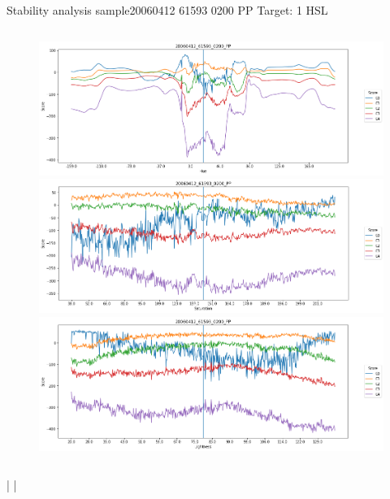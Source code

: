 \documentclass{beamer}
\begin{document}
\begin{frame}{Stability analysis sample}{20060412 61593 0200 PP Target: 1 HSL}
\begin{columns}
\begin{column}{0.45\textwidth}
\begin{figure}[p]
\includegraphics[width=\textwidth]{chapter_stability/20060412_61593_0200_PP/h/scores.png}			\includegraphics[width=\textwidth]{chapter_stability/20060412_61593_0200_PP/s/scores.png}			\includegraphics[width=\textwidth]{chapter_stability/20060412_61593_0200_PP/l/scores.png}
\end{figure}
\end{column}
\end{columns}
\href{run:videos_stability/Messidor_20060412_61593_0200_PP_Target_1_Checking_Hue_Sensitivity.mp4}{\color{blue}{Hue}} | \href{run:videos_stability/Messidor_20060412_61593_0200_PP_Target_1_Checking_Saturation_Sensitivity.mp4}{\color{blue}{Saturation}} | \href{run:videos_stability/Messidor_20060412_61593_0200_PP_Target_1_Checking_Luminance_Sensitivity.mp4}{\color{blue}{Lightness}}
\end{frame}
\end{document}
